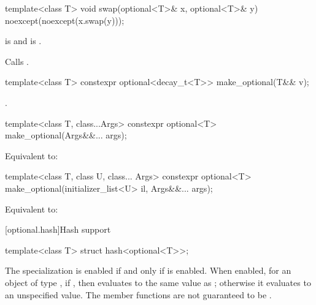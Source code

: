 %
\begin{itemdecl}
template<class T> void swap(optional<T>& x, optional<T>& y) noexcept(noexcept(x.swap(y)));
\end{itemdecl}

\begin{itemdescr}
\pnum
\constraints
{} is  and
 is .

\pnum
\effects
Calls .
\end{itemdescr}

%
\begin{itemdecl}
template<class T> constexpr optional<decay_t<T>> make_optional(T&& v);
\end{itemdecl}

\begin{itemdescr}
\pnum
\returns
{}.
\end{itemdescr}

%
\begin{itemdecl}
template<class T, class...Args>
  constexpr optional<T> make_optional(Args&&... args);
\end{itemdecl}

\begin{itemdescr}
\pnum
\effects
Equivalent to: 
\end{itemdescr}

%
\begin{itemdecl}
template<class T, class U, class... Args>
  constexpr optional<T> make_optional(initializer_list<U> il, Args&&... args);
\end{itemdecl}

\begin{itemdescr}
\pnum
\effects
Equivalent to: 
\end{itemdescr}

[optional.hash]{Hash support}

%
\begin{itemdecl}
template<class T> struct hash<optional<T>>;
\end{itemdecl}

\begin{itemdescr}
\pnum
The specialization  is enabled
if and only if  is enabled.
When enabled, for an object  of type ,
if , then 
evaluates to the same value as ;
otherwise it evaluates to an unspecified value.
The member functions are not guaranteed to be .
\end{itemdescr}


